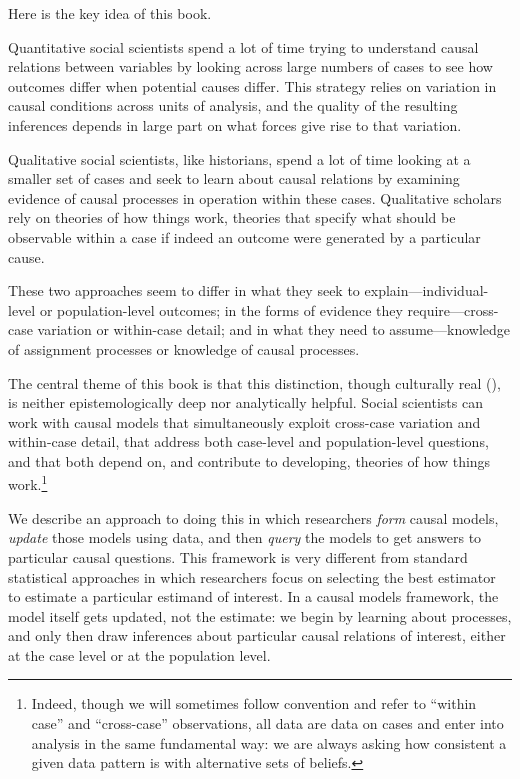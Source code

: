 \documentclass[
  12pt,
]{book}
\begin{document}
Here is the key idea of this book.

Quantitative social scientists spend a lot of time trying to understand causal relations between variables by looking across large numbers of cases to see how outcomes differ when potential causes differ. This strategy relies on variation in causal conditions across units of analysis, and the quality of the resulting inferences depends in large part on what forces give rise to that variation.

Qualitative social scientists, like historians, spend a lot of time looking at a smaller set of cases and seek to learn about causal relations by examining evidence of causal processes in operation within these cases. Qualitative scholars rely on theories of how things work, theories that specify what should be observable within a case if indeed an outcome were generated by a particular cause.

These two approaches seem to differ in what they seek to explain---individual-level or population-level outcomes; in the forms of evidence they require---cross-case variation or within-case detail; and in what they need to assume---knowledge of assignment processes or knowledge of causal processes.

The central theme of this book is that this distinction, though culturally real (\citet{goertz2012tale}), is neither epistemologically deep nor analytically helpful. Social scientists can work with causal models that simultaneously exploit cross-case variation and within-case detail, that address both case-level and population-level questions, and that both depend on, and contribute to developing, theories of how things work.\footnote{Indeed, though we will sometimes follow convention and refer to ``within case'' and ``cross-case'' observations, all data are data on cases and enter into analysis in the same fundamental way: we are always asking how consistent a given data pattern is with alternative sets of beliefs.}

We describe an approach to doing this in which researchers \emph{form} causal models, \emph{update} those models using data, and then \emph{query} the models to get answers to particular causal questions. This framework is very different from standard statistical approaches in which researchers focus on selecting the best estimator to estimate a particular estimand of interest. In a causal models framework, the model itself gets updated, not the estimate: we begin by learning about processes, and only then draw inferences about particular causal relations of interest, either at the case level or at the population level.
\end{document}
